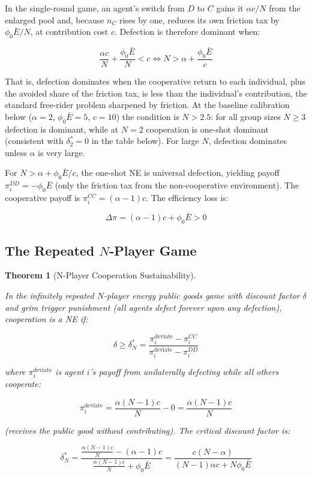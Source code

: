 \documentclass[11pt]{article}
\theoremstyle{plain}
\newtheorem{theorem}{Theorem}
\theoremstyle{definition}
\theoremstyle{remark}
\let\origsubsection\subsection
\renewcommand{\subsection}{\needspace{7\baselineskip}\origsubsection}
\begin{document}
In the single-round game, an agent's switch from \(D\) to \(C\) gains it
\(\alpha c/N\) from the enlarged pool and, because \(n_C\) rises by one,
reduces its own friction tax by \(\phi_0 \bar{E}/N\), at contribution
cost \(c\). Defection is therefore dominant when:

\[\frac{\alpha c}{N} + \frac{\phi_0 \bar{E}}{N} < c \iff N > \alpha + \frac{\phi_0 \bar{E}}{c}\]

That is, defection dominates when the cooperative return to each
individual, plus the avoided share of the friction tax, is less than the
individual's contribution, the standard free-rider problem sharpened by
friction. At the baseline calibration below (\(\alpha = 2\),
\(\phi_0\bar{E} = 5\), \(c = 10\)) the condition is \(N > 2.5\): for all
group sizes \(N \geq 3\) defection is dominant, while at \(N = 2\)
cooperation is one-shot dominant (consistent with \(\delta_2^* = 0\) in
the table below). For large \(N\), defection dominates unless \(\alpha\)
is very large.

For \(N > \alpha + \phi_0\bar{E}/c\), the one-shot NE is universal
defection, yielding payoff \(\pi_i^{DD} = -\phi_0 \bar{E}\) (only the
friction tax from the non-cooperative environment). The cooperative
payoff is \(\pi_i^{CC} = (\alpha - 1)c\). The efficiency loss is:

\[\Delta\pi = (\alpha - 1)c + \phi_0 \bar{E} > 0\]

\subsection{\texorpdfstring{The Repeated \(N\)-Player
Game}{The Repeated N-Player Game}}\label{the-repeated-n-player-game}

\begin{theorem}[N-Player Cooperation Sustainability]
\label{thm-n-player-cooperation}

In the infinitely repeated $N$-player energy public goods game with discount factor $\delta$ and grim trigger punishment (all agents defect forever upon any defection), cooperation is a NE if:

$$\delta \geq \delta_N^* = \frac{\pi_i^{\text{deviate}} - \pi_i^{CC}}{\pi_i^{\text{deviate}} - \pi_i^{DD}}$$

where $\pi_i^{\text{deviate}}$ is agent $i$'s payoff from unilaterally defecting while all others cooperate:

$$\pi_i^{\text{deviate}} = \frac{\alpha (N-1) c}{N} - 0 = \frac{\alpha(N-1)c}{N}$$

(receives the public good without contributing). The critical discount factor is:

$$\delta_N^* = \frac{\frac{\alpha(N-1)c}{N} - (\alpha - 1)c}{\frac{\alpha(N-1)c}{N} + \phi_0 \bar{E}} = \frac{c(N - \alpha)}{(N-1)\alpha c + N\phi_0\bar{E}}$$
\end{theorem}
\end{document}
